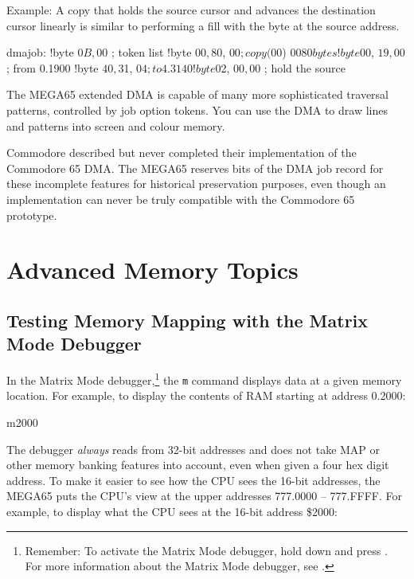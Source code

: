 Example: A copy that holds the source cursor and advances the destination cursor linearly is similar to performing a fill with the byte at the source address.

\begin{asmcode}
dmajob:
!byte $0B, $00       ; token list
!byte $00, $80, $00  ; copy ($00) $0080 bytes
!byte $00, $19, $00  ; from 0.1900
!byte $40, $31, $04  ; to 4.3140
!byte $02, $00, $00  ; hold the source
\end{asmcode}

The MEGA65 extended DMA is capable of many more sophisticated traversal patterns, controlled by job option tokens. You can use the DMA to draw lines and patterns into screen and colour memory.

Commodore described but never completed their implementation of the Commodore 65 DMA. The MEGA65 reserves bits of the DMA job record for these incomplete features for historical preservation purposes, even though an implementation can never be truly compatible with the Commodore 65 prototype.


\newpage
\section{Advanced Memory Topics}

\subsection{Testing Memory Mapping with the Matrix Mode Debugger}

In the Matrix Mode debugger,\footnote{Remember: To activate the Matrix Mode debugger, hold down \megasymbolkey and press . For more information about the Matrix Mode debugger, see .} the \texttt{m} command displays data at a given memory location. For example, to display the contents of RAM starting at address 0.2000:

\begin{basiccode}
m2000
\end{basiccode}

The debugger {\em always} reads from 32-bit addresses and does not take MAP or other memory banking features into account, even when given a four hex digit address. To make it easier to see how the CPU sees the 16-bit addresses, the MEGA65 puts the CPU's view at the upper addresses 777.0000 -- 777.FFFF. For example, to display what the CPU sees at the 16-bit address \$2000:

